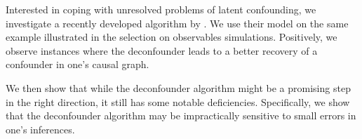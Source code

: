 Interested in coping with unresolved problems of latent confounding, we investigate a recently developed algorithm by \citet{wang_2019_blessings}. 
We use their model on the same example illustrated in
the selection on observables simulations.
Positively, we observe instances where the deconfounder leads to a better recovery of 
a confounder in one's causal graph. 

We then show that while the deconfounder algorithm might be a promising step in the right direction, 
it still has some notable deficiencies. Specifically, we show that the deconfounder algorithm may be 
impractically sensitive to small errors in one's inferences.

